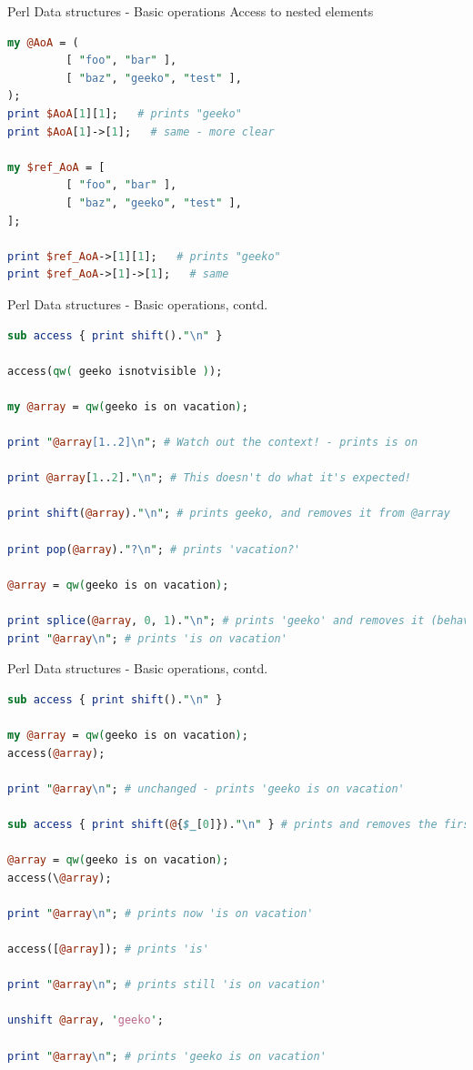 \documentclass[10pt]{beamer}
\begin{document}
\begin{frame}[fragile]{Perl Data structures - Basic operations}
Access to nested elements
\begin{lstlisting}[language=perl]
my @AoA = (
         [ "foo", "bar" ],
         [ "baz", "geeko", "test" ],
);
print $AoA[1][1];   # prints "geeko"
print $AoA[1]->[1];   # same - more clear

my $ref_AoA = [
         [ "foo", "bar" ],
         [ "baz", "geeko", "test" ],
];

print $ref_AoA->[1][1];   # prints "geeko"
print $ref_AoA->[1]->[1];   # same
\end{lstlisting}
\end{frame}


\begin{frame}[fragile]{Perl Data structures - Basic operations, contd. }

\begin{lstlisting}[language=perl]
sub access { print shift()."\n" }

access(qw( geeko isnotvisible ));

my @array = qw(geeko is on vacation);

print "@array[1..2]\n"; # Watch out the context! - prints is on

print @array[1..2]."\n"; # This doesn't do what it's expected!

print shift(@array)."\n"; # prints geeko, and removes it from @array

print pop(@array)."?\n"; # prints 'vacation?'

@array = qw(geeko is on vacation);

print splice(@array, 0, 1)."\n"; # prints 'geeko' and removes it (behaves like shift)
print "@array\n"; # prints 'is on vacation'
\end{lstlisting}
\end{frame}

\begin{frame}[fragile]{Perl Data structures - Basic operations, contd.}
\begin{lstlisting}[language=perl]
sub access { print shift()."\n" }

my @array = qw(geeko is on vacation);
access(@array);

print "@array\n"; # unchanged - prints 'geeko is on vacation'

sub access { print shift(@{$_[0]})."\n" } # prints and removes the first element of arrayref

@array = qw(geeko is on vacation);
access(\@array);

print "@array\n"; # prints now 'is on vacation'

access([@array]); # prints 'is'

print "@array\n"; # prints still 'is on vacation'

unshift @array, 'geeko';

print "@array\n"; # prints 'geeko is on vacation'
\end{lstlisting}
\end{frame}
\end{document}
